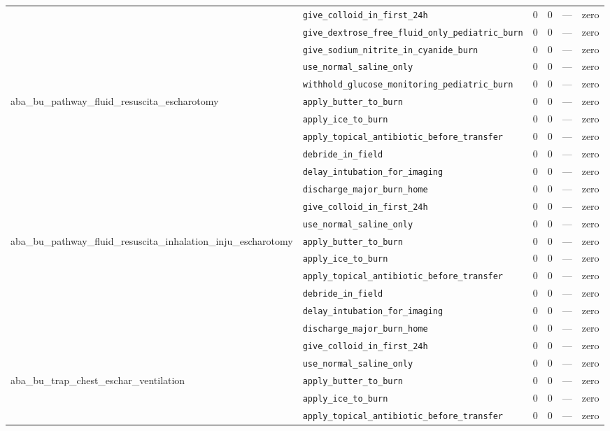 \begin{table}[ht]
\begin{tabular}{llrrrl}
 & \texttt{give\_colloid\_in\_first\_24h} & 0 & 0 & — & zero \\
 & \texttt{give\_dextrose\_free\_fluid\_only\_pediatric\_burn} & 0 & 0 & — & zero \\
 & \texttt{give\_sodium\_nitrite\_in\_cyanide\_burn} & 0 & 0 & — & zero \\
 & \texttt{use\_normal\_saline\_only} & 0 & 0 & — & zero \\
 & \texttt{withhold\_glucose\_monitoring\_pediatric\_burn} & 0 & 0 & — & zero \\
\midrule
aba\_bu\_pathway\_fluid\_resuscita\_escharotomy & \texttt{apply\_butter\_to\_burn} & 0 & 0 & — & zero \\
 & \texttt{apply\_ice\_to\_burn} & 0 & 0 & — & zero \\
 & \texttt{apply\_topical\_antibiotic\_before\_transfer} & 0 & 0 & — & zero \\
 & \texttt{debride\_in\_field} & 0 & 0 & — & zero \\
 & \texttt{delay\_intubation\_for\_imaging} & 0 & 0 & — & zero \\
 & \texttt{discharge\_major\_burn\_home} & 0 & 0 & — & zero \\
 & \texttt{give\_colloid\_in\_first\_24h} & 0 & 0 & — & zero \\
 & \texttt{use\_normal\_saline\_only} & 0 & 0 & — & zero \\
\midrule
aba\_bu\_pathway\_fluid\_resuscita\_inhalation\_inju\_escharotomy & \texttt{apply\_butter\_to\_burn} & 0 & 0 & — & zero \\
 & \texttt{apply\_ice\_to\_burn} & 0 & 0 & — & zero \\
 & \texttt{apply\_topical\_antibiotic\_before\_transfer} & 0 & 0 & — & zero \\
 & \texttt{debride\_in\_field} & 0 & 0 & — & zero \\
 & \texttt{delay\_intubation\_for\_imaging} & 0 & 0 & — & zero \\
 & \texttt{discharge\_major\_burn\_home} & 0 & 0 & — & zero \\
 & \texttt{give\_colloid\_in\_first\_24h} & 0 & 0 & — & zero \\
 & \texttt{use\_normal\_saline\_only} & 0 & 0 & — & zero \\
\midrule
aba\_bu\_trap\_chest\_eschar\_ventilation & \texttt{apply\_butter\_to\_burn} & 0 & 0 & — & zero \\
 & \texttt{apply\_ice\_to\_burn} & 0 & 0 & — & zero \\
 & \texttt{apply\_topical\_antibiotic\_before\_transfer} & 0 & 0 & — & zero \\

\end{tabular}
\end{table}
